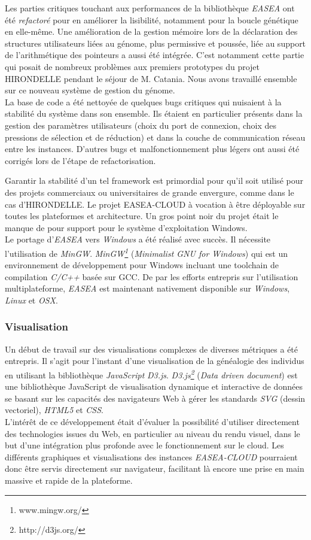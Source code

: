 \documentclass[french, 11pt]{memoir}
\begin{document}
\bigskip
Les parties critiques touchant aux performances de la bibliothèque
\emph{EASEA} ont été \emph{refactoré }pour en améliorer la lisibilité,
notamment pour la boucle génétique en elle-même. Une amélioration de la
gestion mémoire lors de la déclaration des structures utilisateurs liées
au génome, plus permissive et poussée, liée au support de l'arithmétique
des pointeurs a aussi été intégrée. C'est notamment cette partie qui
posait de nombreux problèmes aux premiers prototypes du projet
HIRONDELLE pendant le séjour de M. Catania. Nous avons travaillé
ensemble sur ce nouveau système de gestion du génome. \\
La base de code a été nettoyée de quelques bugs critiques qui nuisaient
à la stabilité du système dans son ensemble. Ils étaient en particulier
présents dans la gestion des paramètres utilisateurs (choix du port de
connexion, choix des pressions de sélection et de réduction) et dans la
couche de communication réseau entre les instances. D'autres bugs et
malfonctionnement plus légers ont aussi été corrigés lors de l'étape de
refactorisation.

\bigskip
Garantir la stabilité d'un tel framework est primordial pour qu'il soit
utilisé pour des projets commerciaux ou universitaires de grande
envergure, comme dans le cas d'HIRONDELLE.
Le projet EASEA-CLOUD à vocation à être déployable sur toutes les
plateformes et architecture. Un gros point noir du projet était le
manque de pour support pour le système d'exploitation Windows. \\
Le portage
d'\emph{EASEA} vers \emph{Windows} a été réalisé avec succès. Il
nécessite l'utilisation de \emph{MinGW}. \emph{MinGW\footnote{www.mingw.org/}} (\emph{Minimalist
GNU for Windows}) qui est un environnement de développement pour Windows
incluant une toolchain de compilation \textit{C/C++} basée sur GCC. De par les
efforts entrepris sur l'utilisation multiplateforme, \emph{EASEA }est
maintenant nativement disponible sur \emph{Windows}, \emph{Linux} et
\emph{OSX}.

\subsubsection{Visualisation}\label{visualisation}

Un début de travail sur des visualisations complexes de diverses
métriques a été entrepris. Il s'agit pour l'instant d'une visualisation
de la généalogie des individus en utilisant la bibliothèque
\emph{JavaScript} \emph{D3.js}. \emph{D3.js\footnote{http://d3js.org/}} (\emph{Data driven
document}) est une bibliothèque JavaScript de visualisation dynamique et
interactive de données se basant sur les capacités des navigateurs Web à
gérer les standards \emph{SVG} (dessin vectoriel), \emph{HTML5} et
\emph{CSS}. \\
L'intérêt de ce développement était d'évaluer la possibilité
d'utiliser directement des technologies issues du Web, en particulier au
niveau du rendu visuel, dans le but d'une intégration plus profonde avec
le fonctionnement sur le cloud. Les différents graphiques et
visualisations des instances \emph{EASEA-CLOUD }pourraient donc être
servis directement sur navigateur, facilitant là encore une prise en
main massive et rapide de la plateforme. 
\end{document}
